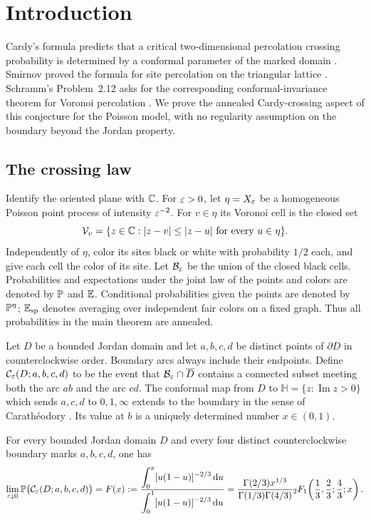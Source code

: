 \section{Introduction}\label{sec:introduction}

Cardy's formula predicts that a critical two-dimensional percolation crossing
probability is determined by a conformal parameter of the marked domain
\cite{Cardy1992}. Smirnov proved the formula for site percolation on the
triangular lattice \cite{Smirnov2001}. Schramm's Problem~2.12 asks for the
corresponding conformal-invariance theorem for Voronoi percolation
\cite{Schramm2006}. We prove the annealed Cardy-crossing aspect of this
conjecture for the Poisson model, with no regularity assumption on the
boundary beyond the Jordan property.

\subsection{The crossing law}

Identify the oriented plane with $\mathbb C$. For $\varepsilon>0$, let $\eta=X_\varepsilon$ be
a homogeneous Poisson point process of intensity $\varepsilon^{-2}$. For $v\in\eta$
its Voronoi cell is the closed set
\[
 \mathcal V_v=\{z\in\mathbb C:|z-v|\le |z-u|\text{ for every }u\in\eta\}.
\]
Independently of $\eta$, color its sites black or white with probability
$1/2$ each, and give each cell the color of its site. Let $\mathcal B_\varepsilon$
be the union of the closed black cells. Probabilities and expectations under
the joint law of the points and colors are denoted by $\mathbb P$ and $\mathbb E$.
Conditional probabilities given the points are denoted by $\mathbb P^{\eta}$;
$\mathbb E_{\mathrm{sp}}$ denotes averaging over independent fair colors on a fixed graph.
Thus all probabilities in the main theorem are annealed.

Let $D$ be a bounded Jordan domain and let $a,b,c,d$ be distinct points of
$\partial D$ in counterclockwise order. Boundary arcs always include their
endpoints. Define $\mathcal C_\varepsilon(D;a,b,c,d)$ to be the event that
$\mathcal B_\varepsilon\cap\overline D$ contains a connected subset meeting both
the arc $ab$ and the arc $cd$. The conformal map from $D$ to
$\mathbb H=\{z:\operatorname{Im}z>0\}$ which sends $a,c,d$ to
$0,1,\infty$ extends to the boundary in the sense of Carath\'eodory
\cite[Section~2.1, p.~18]{Pommerenke1992}.
Its value at $b$ is a uniquely determined number $x\in(0,1)$.

\begin{theorem}\label{thm:cardy}
For every bounded Jordan domain $D$ and every four distinct
counterclockwise boundary marks $a,b,c,d$, one has
\begin{equation}\label{eq:cardy}
 \lim_{\varepsilon\downarrow0}\mathbb P\bigl(\mathcal C_\varepsilon(D;a,b,c,d)\bigr)
 =F(x)
 :=\frac{\displaystyle\int_0^x[u(1-u)]^{-2/3}\,\mathrm d u}
          {\displaystyle\int_0^1[u(1-u)]^{-2/3}\,\mathrm d u}
 =\frac{\Gamma(2/3)x^{1/3}}
        {\Gamma(1/3)\Gamma(4/3)}
        {}_2F_1\!\left(\frac13,\frac23;\frac43;x\right).
\end{equation}
\end{theorem}

